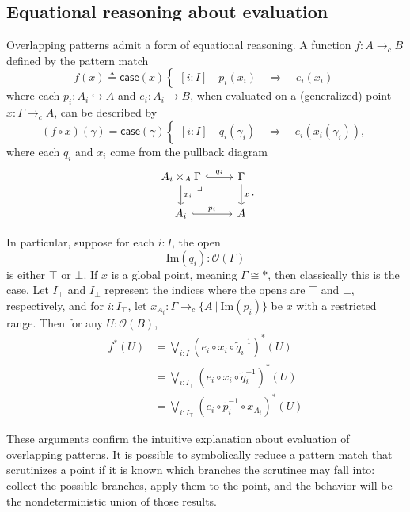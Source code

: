 \documentclass[conference]{IEEEtran}
\newcommand{\hookto}{\hookrightarrow}
\newcommand{\cto}{\to_c}
\newcommand{\suchthat}{\ |\ }
\newcommand{\One}{\ast}
\newcommand{\Open}[1]{\mathcal{O}({#1})}
\newcommand{\Img}[1]{\text{Im}\left({#1}\right)}
\newcommand{\Branch}{\Rightarrow}
\newcommand{\iimg}[1]{#1^*}
\newcommand{\grammar}[1]{\textcolor{red}{\underline{#1}}}
\renewcommand{\grammar}[1]{#1}
\begin{document}
\subsection{Equational reasoning about evaluation}

Overlapping patterns admit a form of equational reasoning. A function $f : A \cto B$ defined by the pattern match
\[
f(x) \triangleq \mathsf{case}(x)
\begin{cases}
[i : I] \quad p_i(x_i) \quad \Branch \quad e_i(x_i)
\end{cases}
\]
where each $p_i : A_i \hookto A$ and $e_i : A_i \to B$,
when evaluated on a (generalized) point $x : \Gamma \cto A$,
can be described by
\[
(f \circ x)(\gamma) = \mathsf{case}(\gamma)
\begin{cases}
[i : I] \quad q_i(\gamma_i) \quad \Branch \quad e_i(x_i(\gamma_i)),
\end{cases}
\]
where each $q_i$ and $x_i$ come from the pullback diagram
\begin{equation*}
\begin{tikzcd}
A_i \times_A \Gamma \arrow[r, hook, "q_i"]
   \arrow[d, "x_i"]
   \arrow[dr, phantom, "\lrcorner", very near start]
& \Gamma \arrow[d, "x"]
\\ A_i \arrow[r, hook, "p_i"]
& A
\end{tikzcd}.
\end{equation*}

In particular, suppose for each $i : I$, the open
\[
\Img{q_i} : \Open{\Gamma}
\]
is either $\top$ or $\bot$. If $x$ is a global point, meaning $\Gamma \cong \One$, then classically \grammar{this} is the case. Let $I_\top$ and $I_\bot$ represent the indices where the opens are $\top$ and $\bot$, respectively, and for $i : I_\top$, let $x_{A_i} : \Gamma \cto \{ A \suchthat \Img{p_i} \}$ be $x$ with a restricted range. Then for any $U : \Open{B}$,
\begin{align*}
\iimg{f}(U) &= \bigvee_{i : I} \iimg{(e_i \circ x_i \circ \tilde{q}_i^{-1})}(U)
\\ &= \bigvee_{i : I_\top} \iimg{(e_i \circ x_i \circ \tilde{q}_i^{-1})}(U)
\\ &= \bigvee_{i : I_\top} \iimg{(e_i \circ \tilde{p}_i^{-1} \circ x_{A_i})}(U)
\end{align*}

These arguments confirm the intuitive explanation about evaluation of overlapping patterns. It is possible to symbolically reduce a pattern match that scrutinizes a point if it is known which branches the scrutinee may fall into: collect the possible branches, apply them to the point, and the behavior will be the nondeterministic union of those results.
\end{document}
